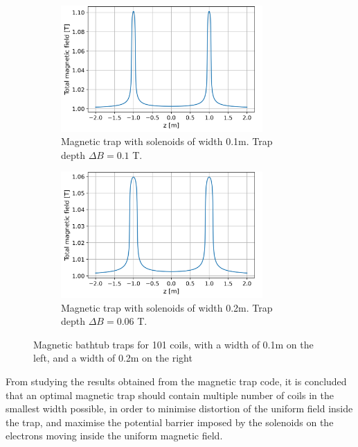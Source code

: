\documentclass[a4paper,12pt, notitlepage]{article}
\begin{document}
\begin{figure}
    \centering
    \begin{subfigure}[b]{0.45\textwidth}
        \includegraphics[width=77mm]{pictures/bathtubTrapCoils=101_Width=0,1.png}
        \caption{Magnetic trap with solenoids of width 0.1m. Trap depth $\Delta B=0.1$ T.}
        \label{fig:101coilsWidth=0.1}
    \end{subfigure} 
    \quad
    \begin{subfigure}[b]{0.45\textwidth}
        \includegraphics[width=77mm]{pictures/bathtubTrapCoils=101_Width=0,2.png}
        \caption{Magnetic trap with solenoids of width 0.2m. Trap depth $\Delta B=0.06$ T.}
        \label{fig:101coilsWidth=0.2}
    \end{subfigure}
\caption{Magnetic bathtub traps for 101 coils, with a width of 0.1m on the left, and a width of 0.2m on the right}
\label{fig:bathtub101coils}
\end{figure}

From studying the results obtained from the magnetic trap code, it is concluded that an optimal magnetic trap should contain multiple number of coils in the smallest width possible, in order to minimise distortion of the uniform field inside the trap, and maximise the potential barrier imposed by the solenoids on the electrons moving inside the uniform magnetic field. 
\end{document}
